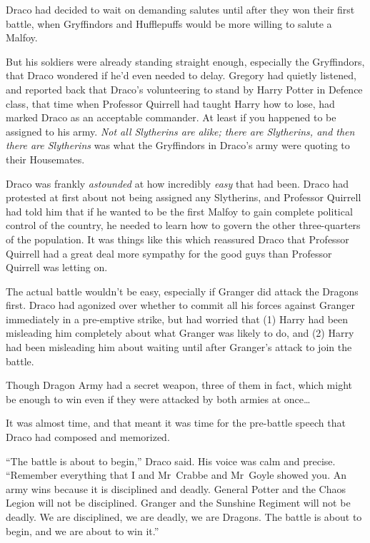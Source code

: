 Draco had decided to wait on demanding salutes until after they won their first battle, when Gryffindors and Hufflepuffs would be more willing to salute a Malfoy.

But his soldiers were already standing straight enough, especially the Gryffindors, that Draco wondered if he’d even needed to delay. Gregory had quietly listened, and reported back that Draco’s volunteering to stand by Harry Potter in Defence class, that time when Professor Quirrell had taught Harry how to lose, had marked Draco as an acceptable commander. At least if you happened to be assigned to his army. \emph{Not all Slytherins are alike; there are Slytherins, and then there are Slytherins} was what the Gryffindors in Draco’s army were quoting to their Housemates.

Draco was frankly \emph{astounded} at how incredibly \emph{easy} that had been. Draco had protested at first about not being assigned any Slytherins, and Professor Quirrell had told him that if he wanted to be the first Malfoy to gain complete political control of the country, he needed to learn how to govern the other three-quarters of the population. It was things like this which reassured Draco that Professor Quirrell had a great deal more sympathy for the good guys than Professor Quirrell was letting on.

The actual battle wouldn’t be easy, especially if Granger did attack the Dragons first. Draco had agonized over whether to commit all his forces against Granger immediately in a pre-emptive strike, but had worried that (1) Harry had been misleading him completely about what Granger was likely to do, and (2) Harry had been misleading him about waiting until after Granger’s attack to join the battle.

Though Dragon Army had a secret weapon, three of them in fact, which might be enough to win even if they were attacked by both armies at once…

It was almost time, and that meant it was time for the pre-battle speech that Draco had composed and memorized.

“The battle is about to begin,” Draco said. His voice was calm and precise. “Remember everything that I and Mr~Crabbe and Mr~Goyle showed you. An army wins because it is disciplined and deadly. General Potter and the Chaos Legion will not be disciplined. Granger and the Sunshine Regiment will not be deadly. We are disciplined, we are deadly, we are Dragons. The battle is about to begin, and we are about to win it.”

